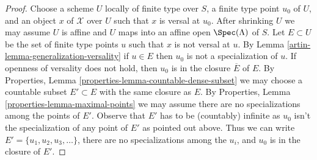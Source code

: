 \begin{proof}

Choose a scheme $U$ locally of finite type over $S$,
a finite type point $u_0$ of $U$, and an object $x$ of $\mathcal{X}$
over $U$ such that $x$ is versal at $u_0$. After shrinking
$U$ we may assume $U$ is affine and $U$ maps into an affine open
$\Spec(\Lambda)$ of $S$. Let $E \subset U$ be the set of finite type
points $u$ such that $x$ is not versal at $u$. By
Lemma \ref{artin-lemma-generalization-versality}
if $u \in E$ then $u_0$ is not a specialization of $u$.
If openness of versality does not hold, then $u_0$ is in the closure
$\overline{E}$ of $E$. By
Properties, Lemma \ref{properties-lemma-countable-dense-subset}
we may choose a countable subset $E' \subset E$ with the same closure
as $E$. By Properties, Lemma \ref{properties-lemma-maximal-points}
we may assume there are no specializations among the points of $E'$.
Observe that $E'$ has to be (countably) infinite as $u_0$
isn't the specialization of any point of $E'$ as pointed out above.
Thus we can write $E' = \{u_1, u_2, u_3, \ldots\}$, there
are no specializations among the $u_i$, and $u_0$ is in the closure
of $E'$.


\end{proof}
